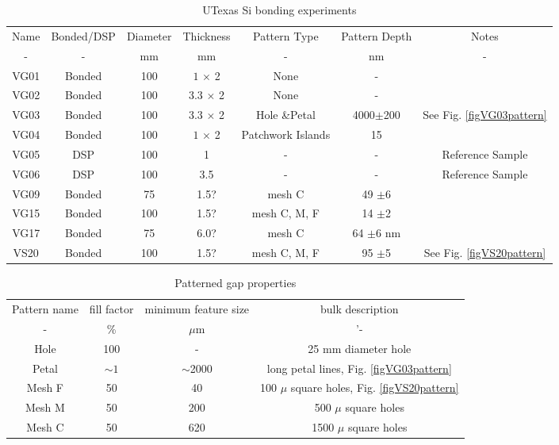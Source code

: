 \documentclass[osajnl,preprint,showpacs,superscriptaddress,12pt]{revtex4-1} %
\begin{document}
\begin{table}[h!]
\caption{UTexas Si bonding experiments \label{tabbondexper}}
\begin{center}
    \begin{tabular}{ c c c c c c c}
    \hline
    Name & Bonded/DSP & Diameter & Thickness & Pattern Type & Pattern Depth & Notes \\ 
    - & - & mm & mm & - & nm & - \\ 
        \hline
    VG01 & Bonded  & 100  &$1$ $\times$ 2 & None  & - &  \\
    VG02 & Bonded & 100 & $3.3$ $\times$ 2 &  None  & - &  \\
    VG03 & Bonded & 100 & $3.3$ $\times$ 2 &  Hole \&Petal & 4000$\pm$200 & See Fig. \ref{figVG03pattern}\\    
    VG04 & Bonded & 100 & $1$ $\times$ 2 &  Patchwork Islands & 15 & \\
    VG05 & DSP & 100 & 1&  - & - & Reference Sample  \\
    VG06 & DSP & 100 & 3.5 &  - & - & Reference Sample \\
    VG09 & Bonded & 75 & 1.5? & mesh C & 49 $\pm$6 & \\
    VG15 & Bonded & 100 & 1.5? &  mesh C, M, F  &14 $\pm$2 & \\
    VG17 & Bonded & 75 & 6.0? &  mesh C & 64 $\pm$6 nm & \\
    VS20 & Bonded & 100 & 1.5? &  mesh C, M, F & 95 $\pm$5 & See Fig. \ref{figVS20pattern}\\
    \hline
    \end{tabular}
\end{center}
\end{table}


\begin{table}[h!]
\caption{Patterned gap properties \label{tabPatternFills}}
\begin{center}
    \begin{tabular}{ c c c c }
    \hline
    Pattern name & fill factor & minimum feature size & bulk description \\ 
    - & \% & $\mu$m & '- \\ 
    Hole & 100 & - & 25 mm diameter hole \\     
    Petal & $\sim1$ & $\sim$2000 & long petal lines, Fig. \ref{figVG03pattern} \\         
    Mesh F & 50 & 40 &  100 $\mu$ square holes, Fig. \ref{figVS20pattern}\\ 
    Mesh M & 50 & 200 &  500 $\mu$ square holes\\ 
    Mesh C & 50 & 620 &  1500 $\mu$ square holes\\     
        \hline
    \end{tabular}
\end{center}
\end{table}
\end{document}
